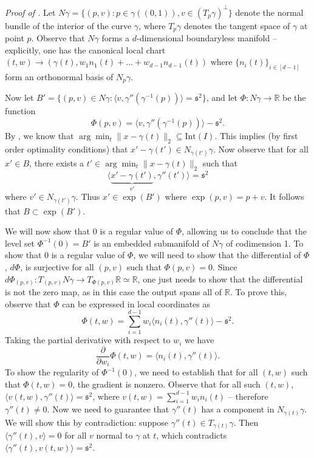 \documentclass[11pt]{article}
\begin{document}
\begin{appendices}
\textit{Proof of .} Let $N\gamma = \{(p, v) : p \in \gamma((0, 1)), v \in (T_p \gamma)^{\bot}\}$ denote the normal bundle of the interior of the curve $\gamma$, where $T_p\gamma$ denotes the tangent space of $\gamma$ at point $p$. Observe that $N\gamma$ forms a $d$-dimensional boundaryless manifold -- explicitly, one has the canonical local chart $(t,w) \rightarrow (\gamma(t), w_1n_1(t) + \dots+w_{d-1}n_{d-1}(t))$ where $\{n_i(t)\}_{i\in [d-1]}$ form an orthonormal basis of $N_p\gamma$. 

Now let $B'= \{(p,v) \in N\gamma : \langle v,  \gamma''(\gamma^{-1}(p))\rangle = \mathfrak s^2\}$, and let $\Phi:N\gamma \rightarrow \mathbb{R}$ be the function
\[\Phi(p,v) = \langle v, \gamma''(\gamma^{-1}(p))\rangle - \mathfrak s^2.\]
By , we know that $\arg \min_t\|x - \gamma(t)\|_2 \subseteq \text{Int}(I)$. This implies (by first order optimality conditions) that $x' - \gamma(t') \in N_{\gamma(t')}\gamma$. Now observe that for all $x' \in B$, there exists a $t' \in \arg\min_t \|x-\gamma(t)\|_2$ such that \[\langle \underbrace{x' - \gamma(t')}_{v'}, \gamma''(t')\rangle = \mathfrak s^2\] where $v' \in N_{\gamma(t')}\gamma$. Thus $x' \in \exp(B')$ where $\exp(p,v) = p + v$. It follows that $B\subset \exp(B')$.

We will now show that $0$ is a regular value of $\Phi$, allowing us to conclude that the level set $\Phi^{-1}(0) = B'$ is an embedded submanifold of $N\gamma$ of codimension 1. To show that $0$ is a regular value of $\Phi$, we will need to show that the differential of $\Phi$, $d\Phi$, is surjective for all $(p,v)$ such that $\Phi(p,v) = 0$. Since $d\Phi_{(p,v)}: T_{(p,v)}N\gamma \rightarrow T_{\Phi(p,v)}\mathbb{R} \simeq\mathbb{R}$, one just needs to show that the differential is not the zero map, as in this case the output spans all of $\mathbb{R}$. To prove this, observe that $\Phi$ can be expressed in local coordinates as
\[\Phi(t,w) = \sum_{i = 1}^{d-1}w_i\langle n_i(t), \gamma''(t)\rangle - \mathfrak s^2.\]
Taking the partial derivative with respect to $w_i$ we have
\[\frac{\partial}{\partial w_i}\Phi(t,w) = \langle n_i(t), \gamma''(t)\rangle.\]
To show the regularity of $\Phi^{-1}(0)$, we need to establish that for all $(t,w)$ such that $\Phi(t,w) = 0$, the gradient is nonzero. Observe that for all such $(t,w)$, $\langle v(t,w), \gamma''(t)\rangle = \mathfrak s^2$, where $v(t,w) = \sum_{i = 1}^{d-1}w_in_{i}(t)$ -- therefore $\gamma''(t) \neq 0$. Now we need to guarantee that $\gamma''(t)$ has a component in $N_{\gamma(t)}\gamma$. We will show this by contradiction: suppose $\gamma''(t) \in T_{\gamma(t)}\gamma$. Then $\langle\gamma''(t), v\rangle = 0$ for all $v$ normal to $\gamma$ at $t$, which contradicts $\langle \gamma''(t), v(t,w) \rangle = \mathfrak s^2$.


\end{appendices}
\end{document}
